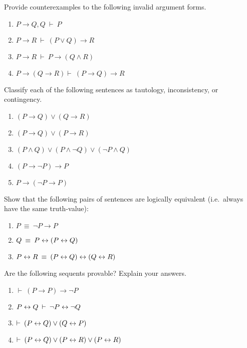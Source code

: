 \begin{exercises} Provide counterexamples to the following invalid
  argument forms.
  \begin{enumerate}
  \item $P\to Q,Q\:\vdash\: P$  
  \item $P\to R\:\vdash\: (P\vee Q)\to R$
  \item $P\to R\:\vdash\: P\to (Q\wedge R)$
  \item $P\to (Q\to R)\vdash\: (P\to Q)\to R$  
  \end{enumerate}
\end{exercises}

\begin{exercises} Classify each of the following sentences as
  tautology, inconsistency, or contingency.
  \begin{enumerate}
  \item $(P\to Q)\vee (Q\to R)$
\item $(P\to Q)\vee (P\to R)$
  \item $(P\wedge Q)\vee (P\wedge \neg Q)\vee (\neg P\wedge Q)$  
  \item $(P\to \neg P)\to P$
  \item $P\to (\neg P\to P)$
  \end{enumerate}
\end{exercises}

\begin{exercises} Show that the following pairs of sentences are
  logically equivalent (i.e.\ always have the same truth-value):
  \begin{enumerate}
  \item $P\:\equiv\:\neg P\to P$  
  \item $Q\:\equiv\: P\leftrightarrow (P\leftrightarrow Q)$
  \item $P\leftrightarrow R\:\equiv\: (P\leftrightarrow Q)\leftrightarrow (Q\leftrightarrow R)$ \end{enumerate} \end{exercises}

\begin{exercises} Are the following sequents provable?  Explain your
  answers.
  \begin{enumerate}
  \item $\vdash\: (P\to P)\to \neg P$
  \item $P\leftrightarrow Q\:\vdash\: \neg P\leftrightarrow \neg Q$
  \item $\vdash\:(P\leftrightarrow Q)\vee (Q\leftrightarrow P)$
    \item $\vdash \:(P\leftrightarrow Q)\vee (P\leftrightarrow R)\vee (P\leftrightarrow R)$  
  \end{enumerate}
\end{exercises}

